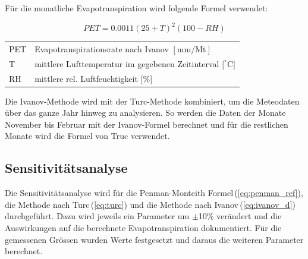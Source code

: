 Für die monatliche Evapotranspiration wird folgende Formel verwendet:

\begin{equation}
\label{eq:ivanov_m}
PET=0.0011(25+T)^2(100-RH)
\end{equation}
\begin{table}[H]
\centering
\begin{tabular}{ll}
PET & Evapotranspirationsrate nach Ivanov  $\mathrm{[mm/Mt]}$\\
T & mittlere Lufttemperatur im gegebenen Zeitinterval $\mathrm{{[^\circ}C]}$\\
RH& mittlere rel. Luftfeuchtigkeit [\%]\\
\end{tabular}
\end{table}

Die Ivanov-Methode wird mit der Turc-Methode kombiniert, um die Meteodaten über das ganze Jahr hinweg zu analysieren. So werden die Daten der Monate November bis Februar mit der Ivanov-Formel berechnet und für die restlichen Monate wird die Formel von Truc verwendet.

\subsection{Sensitivitätsanalyse}

Die Sensitivitätsanalyse wird für die Penman-Monteith Formel\,(\ref{eq:penman_ref}), die Methode nach Turc\,(\ref{eq:turc}) und die Methode nach Ivanov\,(\ref{eq:ivanov_d}) durchgeführt. Dazu wird jeweils ein Parameter um $\pm$10\% verändert und die Auswirkungen auf die berechnete Evapotranspiration dokumentiert. Für die gemessenen Grössen wurden Werte festgesetzt und daraus die weiteren Parameter berechnet.



